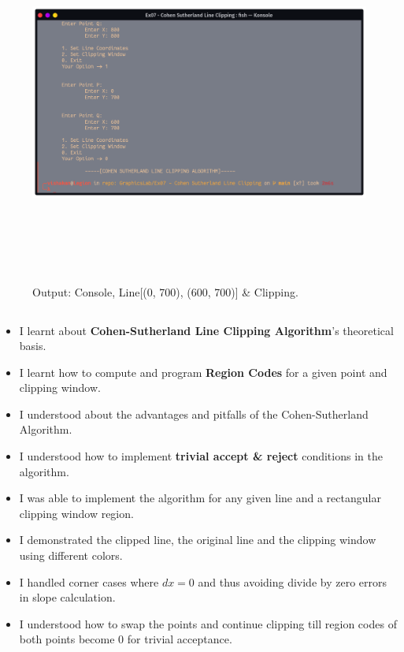 \documentclass[12pt, a4]{article}
\begin{document}
\subsection*{}
\begin{figure}[h]
\centering
\caption{Output: Console, Line[(0, 700), (600, 700)] \& Clipping.}
\includegraphics[height=12cm, width=17cm]{Outputs/Console-4.png}
\end{figure}


\newpage
\subsection*{}
\begin{itemize}
\item I learnt about \textbf{Cohen-Sutherland Line Clipping Algorithm}'s theoretical basis.
\item I learnt how to compute and program \textbf{Region Codes} for a given point and clipping window.
\item I understood about the advantages and pitfalls of the Cohen-Sutherland Algorithm.
\item I understood how to implement \textbf{trivial accept \& reject} conditions in the algorithm.
\item I was able to implement the algorithm for any given line and a rectangular clipping window region.
\item I demonstrated the clipped line, the original line and the clipping window using different colors.
\item I handled corner cases where $dx = 0$ and thus avoiding divide by zero errors in slope calculation.
\item I understood how to swap the points and continue clipping till region codes of both points become 0 for trivial acceptance.
\end{itemize}
\end{document}
